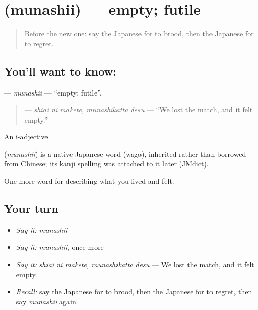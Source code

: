 \section[\texorpdfstring{\ja{むなしい} (munashii)}{むなしい (munashii)}]{ (munashii) — empty; futile}

\label{lesson:JA-C432-munashii}



\begin{quote}
Before the new one: say the Japanese for to brood, then the Japanese for to regret.
\end{quote}

\subsection*{You'll want to know: }
\textbf{} — \emph{munashii} — \textquotedblleft{}empty; futile\textquotedblright{}.

\begin{quote}
\textbf{ } — \emph{shiai ni makete, munashikatta desu} — \textquotedblleft{}We lost the match, and it felt empty.\textquotedblright{}
\end{quote}

An i-adjective.

\begin{cousinweb}
\textbf{} (\emph{munashii}) is a native Japanese word (wago), inherited rather than borrowed from Chinese; its kanji spelling was attached to it later (JMdict).
\end{cousinweb}

\begin{grammarlens}[title={What you've built}]
One more word for describing what you lived and felt.
\end{grammarlens}

\subsection*{Your turn}
\begin{itemize}
\raggedright
  \item \emph{Say it:} \emph{munashii}
  \item \emph{Say it:} \emph{munashii}, once more
  \item \emph{Say it:} \emph{shiai ni makete, munashikatta desu} — We lost the match, and it felt empty.
  \item \emph{Recall:} say the Japanese for to brood, then the Japanese for to regret, then say \emph{munashii} again
\end{itemize}

